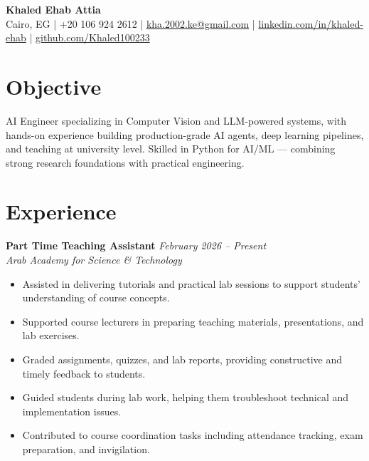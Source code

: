 \documentclass[a4paper,11pt]{article}
\newcommand{\cventry}[4]{%
  \textbf{#1} \hfill \textit{#3} \\
  \textit{#2} \hfill \textit{#4}
  \vspace{2pt}
}
\begin{document}
\begin{center}
  {\LARGE\bfseries Khaled Ehab Attia} \\[6pt]
  \small
  Cairo, EG \quad|\quad
  +20 106 924 2612 \quad|\quad
  \href{mailto:kha.2002.ke@gmail.com}{kha.2002.ke@gmail.com} \quad|\quad
  \href{http://www.linkedin.com/in/khaled-ehab}{linkedin.com/in/khaled-ehab} \quad|\quad
  \href{https://github.com/Khaled100233}{github.com/Khaled100233}
\end{center}

\vspace{4pt}

\section{Objective}

AI Engineer specializing in Computer Vision and LLM-powered systems, with hands-on experience building production-grade AI agents, deep learning pipelines, and teaching at university level. Skilled in Python for AI/ML — combining strong research foundations with practical engineering.

\section{Experience}

\cventry{Part Time Teaching Assistant}{Arab Academy for Science \& Technology}{February 2026 -- Present}{}
\begin{itemize}[leftmargin=1.5em, topsep=2pt, itemsep=1pt]
  \item Assisted in delivering tutorials and practical lab sessions to support students' understanding of course concepts.
  \item Supported course lecturers in preparing teaching materials, presentations, and lab exercises.
  \item Graded assignments, quizzes, and lab reports, providing constructive and timely feedback to students.
  \item Guided students during lab work, helping them troubleshoot technical and implementation issues.
  \item Contributed to course coordination tasks including attendance tracking, exam preparation, and invigilation.
\end{itemize}
\end{document}
